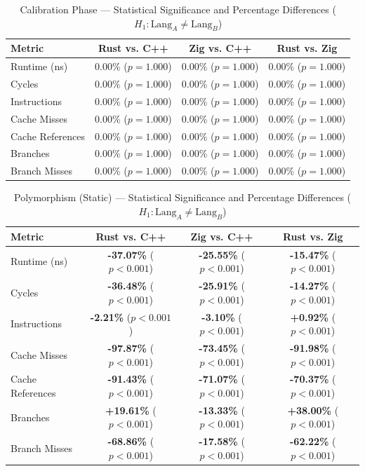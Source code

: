 \begin{table}[htbp]
\centering
\caption{Calibration Phase --- Statistical Significance and Percentage Differences ($H_1: \text{Lang}_A \neq \text{Lang}_B$)}
\label{tab:calibration_N/A}
\begin{tabular}{l ccc}
\toprule
\textbf{Metric} & \textbf{Rust vs. C++} & \textbf{Zig vs. C++} & \textbf{Rust vs. Zig} \\
\midrule
Runtime (ns) & 0.00\% ($p = 1.000$) & 0.00\% ($p = 1.000$) & 0.00\% ($p = 1.000$) \\
Cycles & 0.00\% ($p = 1.000$) & 0.00\% ($p = 1.000$) & 0.00\% ($p = 1.000$) \\
Instructions & 0.00\% ($p = 1.000$) & 0.00\% ($p = 1.000$) & 0.00\% ($p = 1.000$) \\
Cache Misses & 0.00\% ($p = 1.000$) & 0.00\% ($p = 1.000$) & 0.00\% ($p = 1.000$) \\
Cache References & 0.00\% ($p = 1.000$) & 0.00\% ($p = 1.000$) & 0.00\% ($p = 1.000$) \\
Branches & 0.00\% ($p = 1.000$) & 0.00\% ($p = 1.000$) & 0.00\% ($p = 1.000$) \\
Branch Misses & 0.00\% ($p = 1.000$) & 0.00\% ($p = 1.000$) & 0.00\% ($p = 1.000$) \\
\bottomrule
\end{tabular}
\end{table}


\begin{table}[htbp]
\centering
\caption{Polymorphism (Static) --- Statistical Significance and Percentage Differences ($H_1: \text{Lang}_A \neq \text{Lang}_B$)}
\label{tab:poly_stat_N/A}
\begin{tabular}{l ccc}
\toprule
\textbf{Metric} & \textbf{Rust vs. C++} & \textbf{Zig vs. C++} & \textbf{Rust vs. Zig} \\
\midrule
Runtime (ns) & \textbf{-37.07\%} ($p < 0.001$) & \textbf{-25.55\%} ($p < 0.001$) & \textbf{-15.47\%} ($p < 0.001$) \\
Cycles & \textbf{-36.48\%} ($p < 0.001$) & \textbf{-25.91\%} ($p < 0.001$) & \textbf{-14.27\%} ($p < 0.001$) \\
Instructions & \textbf{-2.21\%} ($p < 0.001$) & \textbf{-3.10\%} ($p < 0.001$) & \textbf{+0.92\%} ($p < 0.001$) \\
Cache Misses & \textbf{-97.87\%} ($p < 0.001$) & \textbf{-73.45\%} ($p < 0.001$) & \textbf{-91.98\%} ($p < 0.001$) \\
Cache References & \textbf{-91.43\%} ($p < 0.001$) & \textbf{-71.07\%} ($p < 0.001$) & \textbf{-70.37\%} ($p < 0.001$) \\
Branches & \textbf{+19.61\%} ($p < 0.001$) & \textbf{-13.33\%} ($p < 0.001$) & \textbf{+38.00\%} ($p < 0.001$) \\
Branch Misses & \textbf{-68.86\%} ($p < 0.001$) & \textbf{-17.58\%} ($p < 0.001$) & \textbf{-62.22\%} ($p < 0.001$) \\
\bottomrule
\end{tabular}
\end{table}


